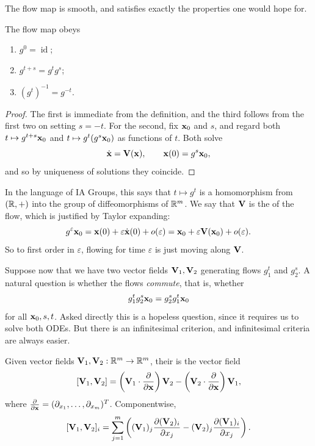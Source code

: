 \documentclass[a4paper]{scrartcl}
\newcommand{\id}{\operatorname{id}}
\begin{document}
The flow map is smooth, and satisfies exactly the properties one would hope for.

\begin{proposition}
	The flow map obeys
	\begin{enumerate}[label=(\roman*)]
		\item $g^0 = \id$;
		\item $g^{t+s} = g^t g^s$;
		\item $(g^t)^{-1} = g^{-t}$.
	\end{enumerate}
\end{proposition}
\begin{proof}
	The first is immediate from the definition, and the third follows from the first two on setting $s = -t$. For the second, fix $\mathbf{x}_0$ and $s$, and regard both $t \mapsto g^{t+s}\mathbf{x}_0$ and $t \mapsto g^t(g^s \mathbf{x}_0)$ as functions of $t$. Both solve
	$$
	\dot{\mathbf{x}} = \mathbf{V}(\mathbf{x}), \qquad \mathbf{x}(0) = g^s \mathbf{x}_0,
	$$
	and so by uniqueness of solutions they coincide.
\end{proof}

In the language of IA Groups, this says that $t \mapsto g^t$ is a homomorphism from $(\mathbb{R}, +)$ into the group of diffeomorphisms of $\mathbb{R}^m$. We say that $\mathbf{V}$ is the  of the flow, which is justified by Taylor expanding:
$$
g^\varepsilon \mathbf{x}_0 = \mathbf{x}(0) + \varepsilon \dot{\mathbf{x}}(0) + o(\varepsilon) = \mathbf{x}_0 + \varepsilon \mathbf{V}(\mathbf{x}_0) + o(\varepsilon).
$$
So to first order in $\varepsilon$, flowing for time $\varepsilon$ is just moving along $\mathbf{V}$.

Suppose now that we have two vector fields $\mathbf{V}_1, \mathbf{V}_2$ generating flows $g_1^t$ and $g_2^s$. A natural question is whether the flows \emph{commute}, that is, whether
$$
g_1^t g_2^s \mathbf{x}_0 = g_2^s g_1^t \mathbf{x}_0
$$
for all $\mathbf{x}_0, s, t$. Asked directly this is a hopeless question, since it requires us to solve both ODEs. But there is an infinitesimal criterion, and infinitesimal criteria are always easier.

\begin{definition}[Commutator]
	Given vector fields $\mathbf{V}_1, \mathbf{V}_2 : \mathbb{R}^m \to \mathbb{R}^m$, their  is the vector field
	$$
	[\mathbf{V}_1, \mathbf{V}_2] = \left(\mathbf{V}_1 \cdot \frac{\partial}{\partial \mathbf{x}}\right) \mathbf{V}_2 - \left(\mathbf{V}_2 \cdot \frac{\partial}{\partial \mathbf{x}}\right)\mathbf{V}_1,
	$$
	where $\frac{\partial}{\partial \mathbf{x}} = (\partial_{x_1}, \dots, \partial_{x_m})^T$. Componentwise,
	$$
	[\mathbf{V}_1, \mathbf{V}_2]_i = \sum_{j=1}^m \left((\mathbf{V}_1)_j \frac{\partial (\mathbf{V}_2)_i}{\partial x_j} - (\mathbf{V}_2)_j \frac{\partial (\mathbf{V}_1)_i}{\partial x_j}\right).
	$$
\end{definition}
\end{document}

